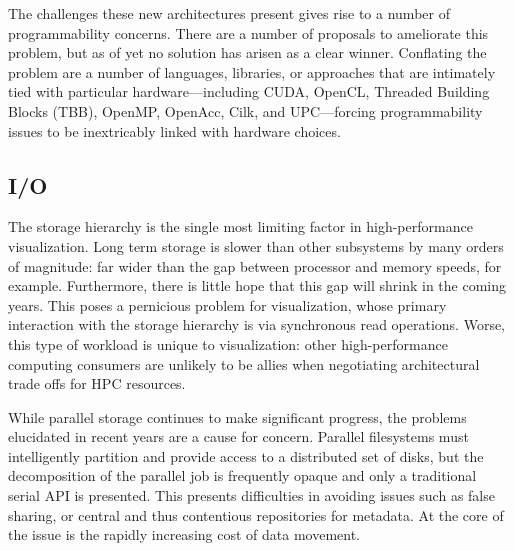 
The challenges these new architectures present gives rise to a number
of programmability concerns.  There are a number of proposals to
ameliorate this problem, but as of yet no solution has arisen as a
clear winner.  Conflating the problem are a number of languages,
libraries, or approaches that are intimately tied with particular
hardware---including CUDA, OpenCL, Threaded Building Blocks (TBB),
OpenMP, OpenAcc, Cilk, and UPC---forcing programmability issues to be
inextricably linked with hardware choices.



\subsection{I/O}

The storage hierarchy is the single most limiting factor in
high-performance visualization.  Long term storage is slower than other
subsystems by many orders of magnitude: far wider than the gap between
processor and memory speeds, for example.  Furthermore, there is little
hope that this gap will shrink in the coming years.  This poses a
pernicious problem for visualization, whose primary interaction with
the storage hierarchy is via synchronous read operations.  Worse, this
type of workload is unique to visualization: other high-performance
computing consumers are unlikely to be allies when negotiating
architectural trade offs for HPC resources.


While parallel storage continues to make significant progress, the
problems elucidated in recent years are a cause for concern.  Parallel
filesystems must intelligently partition and provide access to a
distributed set of disks, but the decomposition of the parallel job
is frequently opaque and only a traditional serial API is presented.
This presents difficulties in avoiding issues such as false sharing, or
central and thus contentious repositories for metadata.  At the core of
the issue is the rapidly increasing cost of data movement.

